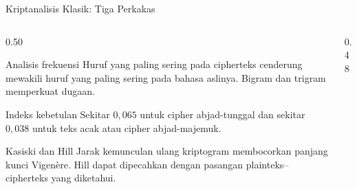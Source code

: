 \documentclass[aspectratio=169,11pt]{beamer}
\begin{document}
\begin{frame}{Kriptanalisis Klasik: Tiga Perkakas}
    \begin{columns}[T,onlytextwidth]
        \begin{column}{0.50\textwidth}
            \scriptsize
            \begin{block}{Analisis frekuensi}
                Huruf yang paling sering pada cipherteks cenderung mewakili
                huruf yang paling sering pada bahasa aslinya. Bigram dan
                trigram memperkuat dugaan.
            \end{block}
            \begin{block}{Indeks kebetulan}
                Sekitar $0{,}065$ untuk cipher abjad-tunggal dan sekitar
                $0{,}038$ untuk teks acak atau cipher abjad-majemuk.
            \end{block}
            \begin{alertblock}{Kasiski dan Hill}
                Jarak kemunculan ulang kriptogram membocorkan panjang kunci
                Vigen\`ere. Hill dapat dipecahkan dengan pasangan
                plainteks--cipherteks yang diketahui.
            \end{alertblock}
        \end{column}
        \begin{column}{0.48\textwidth}
            \centering
        \end{column}
    \end{columns}
\end{frame}
\end{document}
